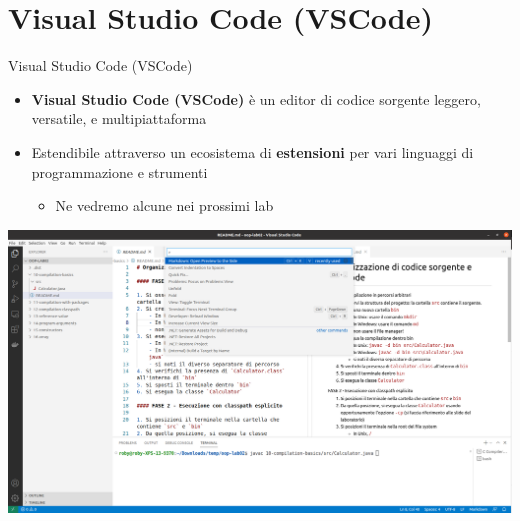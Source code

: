 \documentclass[xcolor=dvipsnames,presentation]{beamer}
\begin{document}
\section{Visual Studio Code (VSCode)}

\begin{frame}{Visual Studio Code (VSCode)}

\begin{itemize}
\item \textbf{Visual Studio Code (VSCode)} è un editor di codice sorgente leggero, versatile, e multipiattaforma
\item Estendibile attraverso un ecosistema di \textbf{estensioni} per vari linguaggi di programmazione e strumenti
	\begin{itemize}
	\item Ne vedremo alcune nei prossimi lab
	\end{itemize}
\end{itemize}

\end{frame}

\begin{frame}

\includegraphics[width=\textwidth]{img/vscode.png}

\end{frame}
\end{document}
